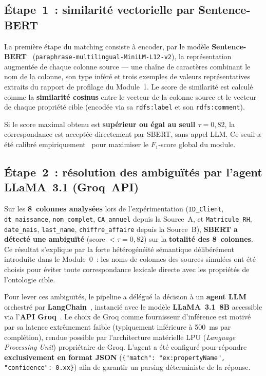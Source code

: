 \subsection{Étape~1~: similarité vectorielle par Sentence-BERT}
\label{subsec:sbert}

La première étape du matching consiste à encoder, par le modèle
\textbf{Sentence-BERT}~\cite{reimers2019sbert}
(\texttt{paraphrase-multilingual-MiniLM-L12-v2}), la représentation
augmentée de chaque colonne source --- une chaîne de caractères
combinant le nom de la colonne, son type inféré et trois exemples de
valeurs représentatives extraits du rapport de profilage du Module~1.
Le score de similarité est calculé comme la \textbf{similarité cosinus}
entre le vecteur de la colonne source et le vecteur de chaque propriété
cible (encodée via sa \texttt{rdfs:label} et son
\texttt{rdfs:comment}).

Si le score maximal obtenu est \textbf{supérieur ou égal au seuil
$\tau = 0{,}82$}, la correspondance est acceptée directement par SBERT,
sans appel LLM. Ce seuil a été calibré empiriquement~\cite{reimers2019sbert}
pour maximiser le $F_1$-score global du module.

\subsection{Étape~2~: résolution des ambiguïtés par l'agent
            LLaMA~3.1 (Groq~API)}
\label{subsec:llm_agent}

Sur les \textbf{8~colonnes analysées} lors de l'expérimentation
(\texttt{ID\_Client}, \texttt{dt\_naissance}, \texttt{nom\_complet},
\texttt{CA\_annuel} depuis la Source~A, et \texttt{Matricule\_RH},
\texttt{date\_nais}, \texttt{last\_name}, \texttt{chiffre\_affaire}
depuis la Source~B), \textbf{SBERT a détecté une ambiguïté} (score
$< \tau = 0{,}82$) sur la \textbf{totalité des 8~colonnes}. Ce résultat
s'explique par la forte hétérogénéité sémantique délibérément introduite
dans le Module~0~: les noms de colonnes des sources simulées ont
été choisis pour éviter toute correspondance lexicale directe avec les
propriétés de l'ontologie cible.

Pour lever ces ambiguïtés, le pipeline a délégué la décision à un
\textbf{agent LLM} orchestré par \textbf{LangChain}~\cite{chase2023langchain},
instancié avec le modèle \textbf{LLaMA~3.1~8B} accessible via
l'\textbf{API Groq}~\cite{groq2024}. Le choix de Groq comme
fournisseur d'inférence est motivé par sa latence extrêmement faible
(typiquement inférieure à 500~ms par complétion), rendue possible par
l'architecture matérielle LPU (\textit{Language Processing Unit})
propriétaire de Groq. L'agent a été configuré pour répondre
\textbf{exclusivement en format JSON} (\texttt{\{"match":
"ex:propertyName", "confidence": 0.xx\}}) afin de garantir un
parsing déterministe de la réponse.

